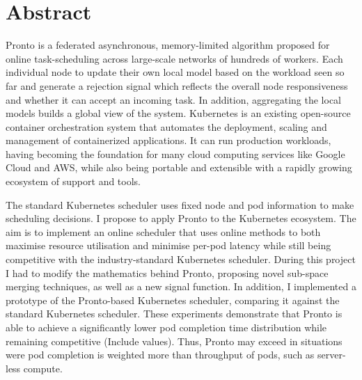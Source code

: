 \chapter*{Abstract}

Pronto is a federated asynchronous, memory-limited algorithm proposed for online
task-scheduling across large-scale networks of hundreds of workers. Each
individual node to update their own local model based on the workload seen so far
and generate a rejection signal which reflects the overall node responsiveness
and whether it can accept an incoming task. In addition, aggregating the local
models builds a global view of the system. Kubernetes is an existing open-source
container orchestration system that automates the deployment, scaling and
management of containerized applications. It can run production workloads,
having becoming the foundation for many cloud computing services like Google
Cloud and AWS, while also being portable and extensible with a rapidly growing
ecosystem of support and tools.

The standard Kubernetes scheduler uses fixed node and pod information to make
scheduling decisions. I propose to apply Pronto to the Kubernetes ecosystem. The
aim is to implement an online scheduler that uses online methods to both
maximise resource utilisation and minimise per-pod latency while still being
competitive with the industry-standard Kubernetes scheduler. During this
project I had to modify the mathematics behind Pronto, proposing novel sub-space
merging techniques, as well as a new signal function. In addition, I implemented
a prototype of the Pronto-based Kubernetes scheduler, comparing it against the
standard Kubernetes scheduler. These experiments demonstrate that Pronto is
able to achieve a significantly lower pod completion time distribution while
remaining competitive (Include values). Thus, Pronto may exceed in situations
were pod completion is weighted more than throughput of pods, such as server-less
compute.

